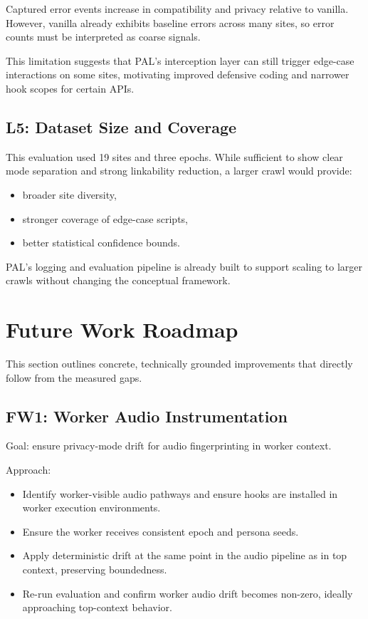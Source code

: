 \documentclass[11pt]{report}
\begin{document}
Captured error events increase in compatibility and privacy relative to vanilla. However, vanilla already exhibits baseline errors across many sites, so error counts must be interpreted as coarse signals.

This limitation suggests that PAL’s interception layer can still trigger edge-case interactions on some sites, motivating improved defensive coding and narrower hook scopes for certain APIs.

\subsection{L5: Dataset Size and Coverage}

This evaluation used 19 sites and three epochs. While sufficient to show clear mode separation and strong linkability reduction, a larger crawl would provide:

\begin{itemize}
    \item broader site diversity,
    \item stronger coverage of edge-case scripts,
    \item better statistical confidence bounds.
\end{itemize}

PAL’s logging and evaluation pipeline is already built to support scaling to larger crawls without changing the conceptual framework.

\section{Future Work Roadmap}

This section outlines concrete, technically grounded improvements that directly follow from the measured gaps.

\subsection{FW1: Worker Audio Instrumentation}

Goal: ensure privacy-mode drift for audio fingerprinting in worker context.

Approach:
\begin{itemize}
    \item Identify worker-visible audio pathways and ensure hooks are installed in worker execution environments.
    \item Ensure the worker receives consistent epoch and persona seeds.
    \item Apply deterministic drift at the same point in the audio pipeline as in top context, preserving boundedness.
    \item Re-run evaluation and confirm worker audio drift becomes non-zero, ideally approaching top-context behavior.
\end{itemize}
\end{document}
